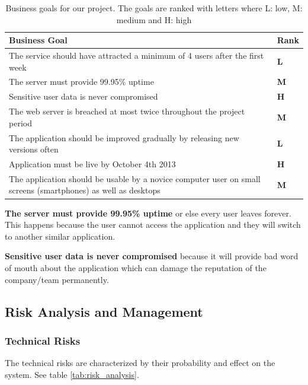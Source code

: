 \documentclass[a4paper]{article}
\begin{document}
\begin{table}[h!]
	\begin{tabular}{|p{10cm}|l|}
		\hline
		\textbf{Business Goal} & \textbf{Rank} \\ \hline
The service should have attracted a minimum of 4 users after the first week & \textbf{L} \\ \hline
The server must provide 99.95\% uptime   & \textbf{M} \\ \hline
Sensitive user data is never compromised & \textbf{H} \\ \hline
The web server is breached at most twice throughout the project period &  \textbf{M} \\ \hline
The application should be improved gradually by releasing new versions often & \textbf{L} \\ \hline
Application must be live by October 4th 2013 &	\textbf{H}\\ \hline
The application should be usable by a novice computer user on small screens (smartphones) as well as desktops & \textbf{M}\\ \hline
	\end{tabular}
	\caption{Business goals for our project. The goals are ranked with letters where L: low, M: medium and H: high}
	\label{tab:business_goals}
\end{table}

\textbf{The server must provide 99.95\% uptime} or else every user leaves forever. This happens because the user cannot access the application and they will switch to another similar application.

\textbf{Sensitive user data is never compromised} because it will provide bad word of mouth about the application which can damage the reputation of the company/team permanently.

\subsection{Risk Analysis and Management}

\subsubsection{Technical Risks}
The technical risks are characterized by their probability and effect on the system. See table \ref{tab:risk_analysis}.
\end{document}
